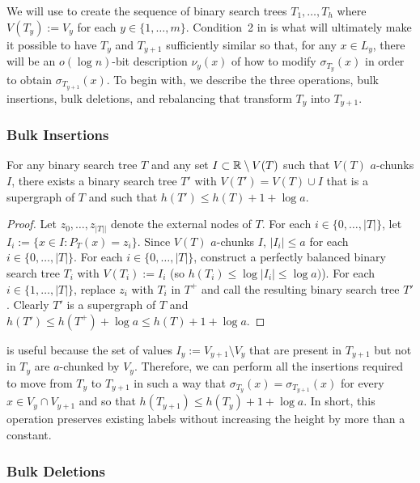 \documentclass[kpfonts]{patmorin}
\begin{document}
We will use  to create the sequence of binary search trees $T_1,\ldots,T_h$ where $V(T_y):=V_y$ for each $y\in\{1,\ldots,m\}$.  Condition~2 in  is what will ultimately make it possible to have $T_y$ and $T_{y+1}$ sufficiently similar so that, for any $x\in L_y$, there will be an $o(\log n)$-bit description $\nu_y(x)$ of how to modify $\sigma_{T_y}(x)$ in order to obtain $\sigma_{T_{y+1}}(x)$.  To begin with, we describe the three operations, bulk insertions, bulk deletions, and rebalancing that transform $T_y$ into $T_{y+1}$.  

\subsubsection{Bulk Insertions}

\begin{lem}
  For any binary search tree $T$ and any set $I\subset\mathbb{R}\setminus V(T)$ such that $V(T)$ $a$-chunks $I$, there exists a binary search tree $T'$ with $V(T')=V(T)\cup I$ that is a supergraph of $T$ and such that $h(T')\le h(T)+1+\log a$.
\end{lem}

\begin{proof}
  Let $z_0,\ldots,z_{|T||}$ denote the external nodes of $T$.  For each $i\in\{0,\ldots,|T|\}$, let $I_i:=\{x\in I: P_T(x)=z_i\}$.
  Since $V(T)$ $a$-chunks $I$, $|I_i|\le a$ for each $i\in\{0,\ldots,|T|\}$. For each $i\in\{0,\ldots,|T|\}$, construct a perfectly balanced binary search tree $T_i$ with $V(T_i):=I_i$ (so $h(T_i)\le\log|I_i|\le\log a)$). For each $i\in\{1,\ldots,|T|\}$, replace $z_i$ with $T_i$ in $T^+$ and call the resulting binary search tree $T'$.  Clearly $T'$ is a supergraph of $T$ and $h(T')\le h(T^+)+\log a\le h(T)+1+\log a$.
\end{proof}

 is useful because the set of values $I_y:=V_{y+1}\setminus V_y$ that are present in $T_{y+1}$ but not in $T_y$ are $a$-chunked by $V_y$. Therefore, we can perform all the insertions required to move from $T_y$ to $T_{y+1}$ in such a way that $\sigma_{T_y}(x)=\sigma_{T_{y+1}}(x)$ for every $x\in V_y\cap V_{y+1}$ and so that $h(T_{y+1})\le h(T_y)+1+\log a$.  In short, this operation preserves existing labels without increasing the height by more than a constant.

\subsubsection{Bulk Deletions}
\end{document}

